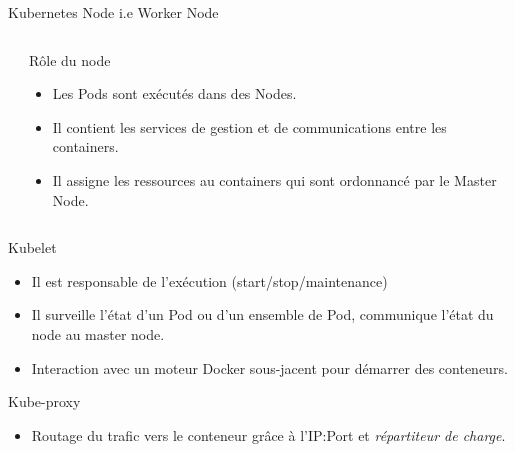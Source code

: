\documentclass{bredelebeamer}
\begin{document}
\begin{frame}{Kubernetes Node i.e Worker Node}
\begin{columns}
\begin{column}{0.3\textwidth}
\end{column}
\begin{column}{0.7\textwidth}
\begin{block}{Rôle du node}
\begin{itemize}
\item Les Pods sont exécutés dans des Nodes. 
\item Il contient les services de gestion et de communications entre les containers.
\item Il assigne les ressources au containers qui sont ordonnancé par le Master Node.
\end{itemize}
\end{block}\pause
\end{column}
\end{columns}
\begin{block}{Kubelet}
\begin{itemize}
\item Il est responsable de l'exécution (start/stop/maintenance)
\item Il surveille l'état d'un Pod ou d'un ensemble de Pod, %
communique l'état du node au master node.
\item Interaction avec un moteur Docker sous-jacent pour démarrer des conteneurs.
\end{itemize}
\end{block}\pause
\begin{block}{Kube-proxy}
\begin{itemize}
\item Routage du trafic vers le conteneur grâce à l'IP:Port et \textit{répartiteur de charge}.
\end{itemize}
\end{block}
\end{frame}
\end{document}
